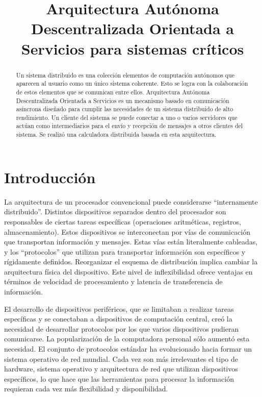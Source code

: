 \documentclass[conference,compsoc]{IEEEtran}
\title{Arquitectura Autónoma Descentralizada Orientada a Servicios para sistemas críticos}
\author{\IEEEauthorblockN{Bruno Campos Uribe}
\IEEEauthorblockA{0223329@up.edu.mx}}
\begin{document}
\maketitle

\begin{abstract}
    Un sistema distribuido es una colección elementos de computación autónomos que aparecen al usuario como un único sistema coherente. Esto se logra con la colaboración de estos elementos que se comunican entre ellos. Arquitectura Autónoma Descentralizada Orientada a Servicios es un mecanismo basado en comunicación asíncrona diseñado para cumplir las necesidades de un sistema distribuido de alto rendimiento. Un cliente del sistema se puede conectar a uno o varios servidores que actúan como intermediarios para el envío y recepción de mensajes a otros clientes del sistema. Se realizó una calculadora distribuida basada en esta arquitectura.
\end{abstract}

\section{Introducción}

La arquitectura de un procesador convencional puede considerarse ``internamente distribuido''. Distintos dispositivos separados dentro del procesador son responsables de ciertas tareas específicas (operaciones aritméticas, registros, almacenamiento). Estos dispositivos se interconectan por vías de comunicación que transportan información y mensajes. Estas vías están literalmente cableadas, y los ``protocolos'' que utilizan para transportar información son específicos y rígidamente definidos. Reorganizar el esquema de distribución implica cambiar la arquitectura física del dispositivo. Este nivel de inflexibilidad ofrece ventajas en términos de velocidad de procesamiento y latencia de transferencia de información.

El desarrollo de dispositivos periféricos, que se limitaban a realizar tareas específicas y se conectaban a dispositivos de computación central, creó la necesidad de desarrollar protocolos por los que varios dispositivos pudieran comunicarse. La popularización de la computadora personal sólo aumentó esta necesidad. El conjunto de protocolos estándar ha evolucionado hacia formar un sistema operativo de red mundial. Cada vez son más irrelevantes el tipo de hardware, sistema operativo y arquitectura de red que utilizan dispositivos específicos, lo que hace que las herramientas para procesar la información requieran cada vez más flexibilidad y disponibilidad.
\cite{farley_1998}
\end{document}
